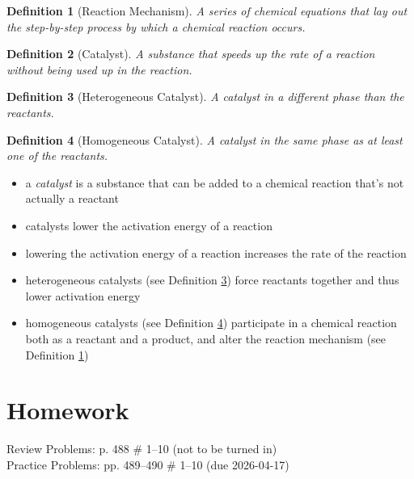 \documentclass[11pt, oneside]{article}   	%
\newtheorem{definition}{Definition}
\begin{document}
\begin{definition}[Reaction Mechanism]\label{def:reaction-mechanism}
A series of chemical equations that lay out the step-by-step process by which a chemical reaction occurs.
\end{definition}

\begin{definition}[Catalyst]\label{def:catalyst}
A substance that speeds up the rate of a reaction without being used up in the reaction.
\end{definition}

\begin{definition}[Heterogeneous Catalyst]\label{def:catalyst-hetero}
A catalyst in a different phase than the reactants.
\end{definition}

\begin{definition}[Homogeneous Catalyst]\label{def:catalyst-homo}
A catalyst in the same phase as at least one of the reactants.
\end{definition}

\begin{itemize}
\item a \emph{catalyst} is a substance that can be added to a chemical reaction that's not actually a reactant
\item catalysts lower the activation energy of a reaction
\item lowering the activation energy of a reaction increases the rate of the reaction
\item heterogeneous catalysts (see Definition \ref{def:catalyst-hetero}) force reactants together and thus lower activation energy
\item homogeneous catalysts (see Definition \ref{def:catalyst-homo}) participate in a chemical reaction both as a reactant and a product, and alter the reaction mechanism (see Definition \ref{def:reaction-mechanism})
\end{itemize}


\section{Homework}
Review Problems: p. 488 \# 1--10 (not to be turned in)\\
Practice Problems: pp. 489--490 \# 1--10 (due 2026-04-17)\\
 
\nocite{wile-chem-2}
%
%
\end{document}
